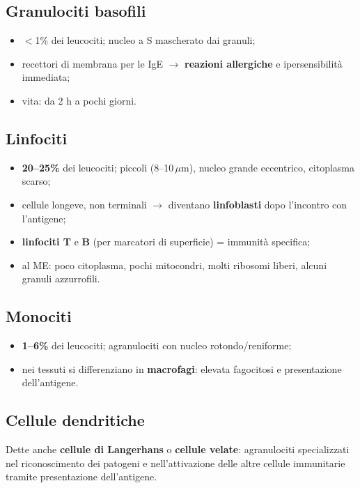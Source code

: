 \subsection{Granulociti basofili}
\begin{itemize}
  \item $<$1\% dei leucociti; nucleo a S mascherato dai granuli;
  \item recettori di membrana per le IgE $\rightarrow$ \textbf{reazioni allergiche} e
    ipersensibilità immediata;
  \item vita: da 2 h a pochi giorni.
\end{itemize}

\subsection{Linfociti}
\begin{itemize}
  \item \textbf{20--25\%} dei leucociti; piccoli (8--10\,$\mu$m), nucleo grande eccentrico,
    citoplasma scarso;
  \item cellule longeve, non terminali $\rightarrow$ diventano \textbf{linfoblasti} dopo l'incontro
    con l'antigene;
  \item \textbf{linfociti T} e \textbf{B} (per marcatori di superficie) = immunità specifica;
  \item al ME: poco citoplasma, pochi mitocondri, molti ribosomi liberi, alcuni granuli azzurrofili.
\end{itemize}

\subsection{Monociti}
\begin{itemize}
  \item \textbf{1--6\%} dei leucociti; agranulociti con nucleo rotondo/reniforme;
  \item nei tessuti si differenziano in \textbf{macrofagi}: elevata fagocitosi e presentazione
    dell'antigene.
\end{itemize}

\subsection{Cellule dendritiche}
Dette anche \textbf{cellule di Langerhans} o \textbf{cellule velate}: agranulociti specializzati
nel riconoscimento dei patogeni e nell'attivazione delle altre cellule immunitarie tramite
presentazione dell'antigene.

